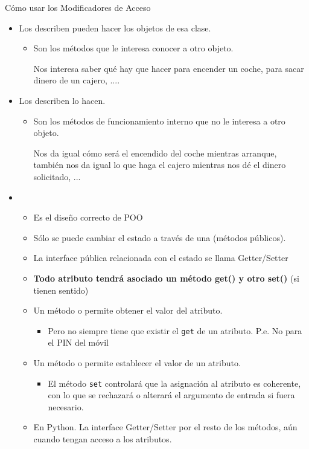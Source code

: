 \documentclass[10pt,envcountsect,spanish]{beamer}
\begin{document}
\begin{frame}{Cómo usar los Modificadores de Acceso} 

\begin{itemize}
\item Los  describen  pueden hacer los objetos de esa clase.
    \begin{itemize}
	\item Son los métodos que le interesa conocer a otro objeto.
	
	\unEjemplo Nos interesa saber qué hay que hacer para encender un coche, para sacar dinero de un cajero, ....
	\end{itemize} 

\item Los  describen  lo hacen.
    \begin{itemize}
	\item Son los métodos de funcionamiento interno que no le interesa  a otro objeto.
	
	\unEjemplo Nos da igual cómo será el encendido del coche mientras arranque, también nos da igual lo que haga el cajero mientras nos dé el dinero solicitado, ...
	\end{itemize} 

\item {}
	\begin{itemize}
	\item Es el diseño correcto de POO
	\item Sólo se puede cambiar el estado a través de una  (métodos públicos).
	\item La interface pública relacionada con el estado se llama Getter/Setter
	\item \textbf{Todo atributo tendrá asociado un método get() y otro set()} (si tienen sentido)
	\item Un método  o  permite obtener el valor del atributo.
		\begin{itemize}
		\item Pero no siempre tiene que existir el \texttt{get} de un atributo. P.e. No para el PIN del móvil
		\end{itemize}
		
	\item Un método  o  permite establecer el valor de un atributo.
		\begin{itemize}
		\item El método \texttt{set} controlará que la asignación al atributo es coherente, con lo que se rechazará o alterará el argumento de entrada si fuera necesario.
		\end{itemize}
	
	\item En Python. La interface Getter/Setter  por el resto de los métodos, aún cuando tengan acceso a los atributos.	
	\end{itemize}
\end{itemize}

\end{frame}
\end{document}
